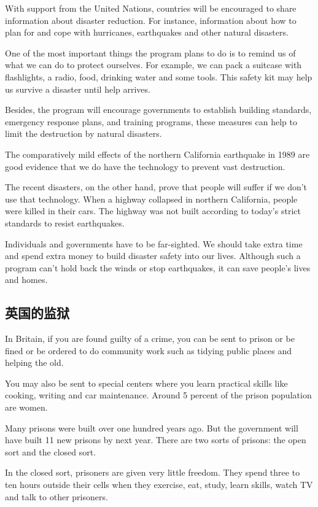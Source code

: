 With support from the United Nations, countries will be encouraged
to share information about disaster reduction.
For instance, information about how to plan for and cope
with hurricanes, earthquakes and other natural disasters.

One of the most important things the program plans to do
is to remind us of what we can do to protect ourselves. For
example, we can pack a suitcase with flashlights, a radio,
food, drinking water and some tools. This safety kit may
help us survive a disaster until help arrives.

Besides, the program will encourage governments to establish
building standards, emergency response plans,
and training programs, these measures can help to limit
the destruction by natural disasters.

The comparatively mild effects of the northern California
earthquake in 1989 are good evidence that we do
have the technology to prevent vast destruction.

The recent disasters, on the other hand, prove that people
will suffer if we don't use that technology. When a highway
collapsed in northern California, people were killed in their
cars. The highway was not built according to today's
strict standards to resist earthquakes.

Individuals and governments have to be far-sighted. We
should take extra time and spend extra money to build disaster
safety into our lives. Although such a program can't
hold back the winds or stop earthquakes, it can save people's
lives and homes.
\subsection{英国的监狱}
In Britain, if you are found guilty of a crime, you can be
sent to prison or be fined or be ordered to do community
work such as tidying public places and helping the old.

You may also be sent to special centers where you learn
practical skills like cooking, writing and car maintenance.
Around 5 percent of the prison population are women.

Many prisons were built over one hundred years ago. But
the government will have built 11 new prisons by next
year. There are two sorts of prisons: the open sort and the
closed sort.

In the closed sort, prisoners are given very little freedom.
They spend three to ten hours outside their cells when they
exercise, eat, study, learn skills, watch TV and talk to other
prisoners.

